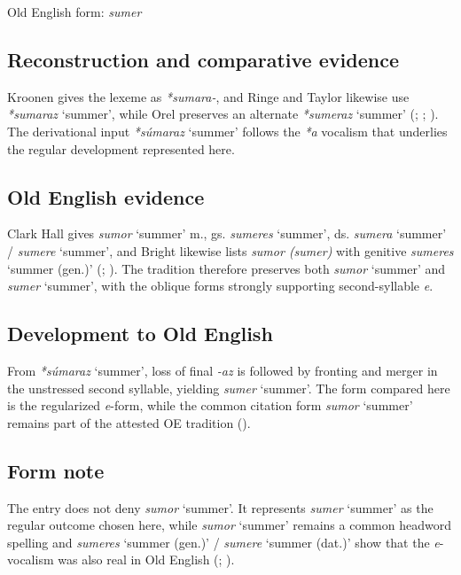 \documentclass[
  british,
  a4paper,
  openany]{book}
\providecommand{\Recon}[1]{\emph{*#1}}
{\catcode`→=\active \global\def→{\ensuremath{\rightarrow}}}
\providecommand{\Recon}[1]{\emph{*#1}}
{\catcode`→=\active \global\def→{\ensuremath{\rightarrow}}}
\begin{document}
Old English form: \emph{sumer}

\subsection{Reconstruction and comparative
evidence}\label{reconstruction-and-comparative-evidence-51}

Kroonen gives the lexeme as \emph{*sumara-}, and Ringe and Taylor
likewise use \Recon{sumaraz} `summer', while Orel preserves an alternate
\Recon{sumeraz} `summer' (;
;
). The derivational input
\Recon{súmaraz} `summer' follows the \emph{*a} vocalism that underlies
the regular development represented here.

\subsection{Old English evidence}\label{old-english-evidence-51}

Clark Hall gives {\emph{sumor}} `summer' m., gs. {\emph{sumeres}}
`summer', ds. {\emph{sumera}} `summer' / {\emph{sumere}} `summer', and
Bright likewise lists \emph{sumor (sumer)} with genitive
{\emph{sumeres}} `summer (gen.)' (; ).
The tradition therefore preserves both {\emph{sumor}} `summer' and
{\emph{sumer}} `summer', with the oblique forms strongly supporting
second-syllable \emph{e}.

\subsection{Development to Old
English}\label{development-to-old-english-51}

From \Recon{súmaraz} `summer', loss of final \emph{-az} is followed by
fronting and merger in the unstressed second syllable, yielding
{\emph{sumer}} `summer'. The form compared here is the regularized
\emph{e}-form, while the common citation form {\emph{sumor}} `summer'
remains part of the attested OE tradition
().

\subsection{Form note}\label{form-note-21}

The entry does not deny {\emph{sumor}} `summer'. It represents
{\emph{sumer}} `summer' as the regular outcome chosen here, while
{\emph{sumor}} `summer' remains a common headword spelling and
{\emph{sumeres}} `summer (gen.)' / {\emph{sumere}} `summer (dat.)' show
that the \emph{e}-vocalism was also real in Old English
(;
).
\end{document}
